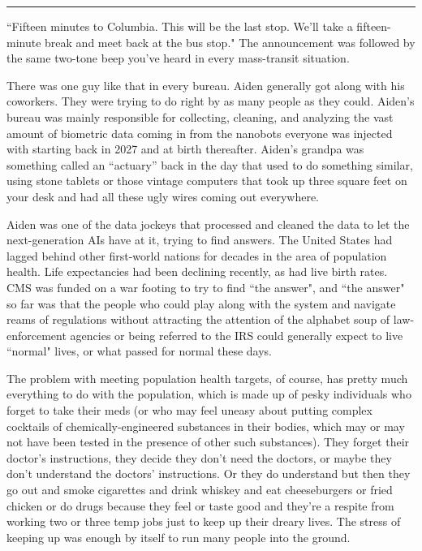 \documentclass[11pt]{book}
\begin{document}
	\vspace{0.5cm}
	\hrule
	\vspace{0.5cm}
	
	``Fifteen minutes to Columbia. This will be the last stop. We'll take a fifteen-minute break and meet back at the bus stop." The announcement was followed by the same two-tone beep you've heard in every mass-transit situation.
	
	There was one guy like that in every bureau. Aiden generally got along with his coworkers. They were trying to do right by as many people as they could. Aiden's bureau was mainly responsible for collecting, cleaning, and analyzing the vast amount of biometric data coming in from the nanobots everyone was injected with starting back in 2027 and at birth thereafter. Aiden's grandpa was something called an ``actuary'' back in the day that used to do something similar, using stone tablets or those vintage computers that took up three square feet on your desk and had all these ugly wires coming out everywhere.
	
	Aiden was one of the data jockeys that processed and cleaned the data to let the next-generation AIs have at it, trying to find answers. The United States had lagged behind other first-world nations for decades in the area of population health. Life expectancies had been declining recently, as had live birth rates. CMS was funded on a war footing to try to find ``the answer", and ``the answer" so far was that the people who could play along with the system and navigate reams of regulations without attracting the attention of the alphabet soup of law-enforcement agencies or being referred to the IRS could generally expect to live ``normal" lives, or what passed for normal these days.
	
	The problem with meeting population health targets, of course, has pretty much everything to do with the population, which is made up of pesky individuals who forget to take their meds (or who may feel uneasy about putting complex cocktails of  chemically-engineered substances in their bodies, which may or may not have been tested in the presence of other such substances). They forget their doctor's instructions, they decide they don't need the doctors, or maybe they don't understand the doctors' instructions. Or they do understand but then they go out and smoke cigarettes and drink whiskey and eat cheeseburgers or fried chicken or do drugs because they feel or taste good and they're a respite from working two or three temp jobs just to keep up their dreary lives. The stress of keeping up was enough by itself to run many people into the ground.
	
\end{document}
